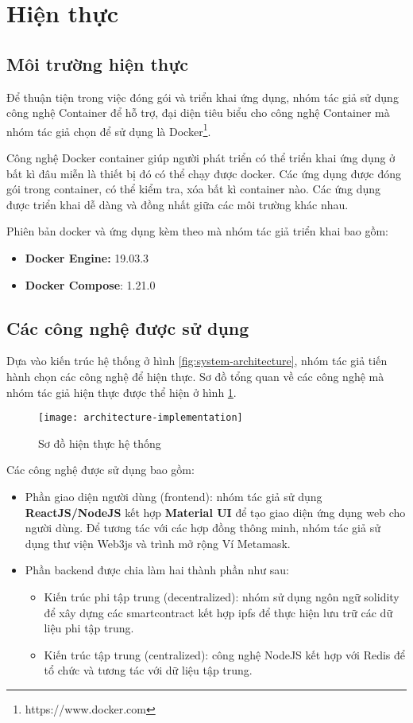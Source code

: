 \documentclass[../main-report.tex]{subfiles}
\begin{document}
\section{Hiện thực}
\subsection{Môi trường hiện thực}
Để thuận tiện trong việc đóng gói và triển khai ứng dụng, nhóm tác giả sử dụng công nghệ Container để hỗ trợ, đại diện tiêu biểu cho công nghệ Container mà nhóm tác giả chọn để sử dụng là Docker\footnote{https://www.docker.com}.

Công nghệ Docker container giúp người phát triển có thể triển khai ứng dụng ở bất kì đâu miễn là thiết bị đó có thể chạy được docker. Các ứng dụng được đóng gói trong container, có thể kiểm tra, xóa bất kì container nào. Các ứng dụng được triển khai dễ dàng và đồng nhất giữa các môi trường khác nhau.

Phiên bản docker và ứng dụng kèm theo mà nhóm tác giả triển khai bao gồm:

\begin{itemize}
\item \textbf{Docker Engine:} 19.03.3
\item \textbf{Docker Compose}: 1.21.0
\end{itemize}

\subsection{Các công nghệ được sử dụng}
Dựa vào kiến trúc hệ thống ở hình \ref{fig:system-architecture}, nhóm tác giả tiến hành chọn các công nghệ để hiện thực. Sơ đồ tổng quan về các công nghệ mà nhóm tác giả hiện thực được thể hiện ở hình \ref{fig:architecture-implementation}.

\begin{figure}[ht!]
\begin{center}
\label{fig:architecture-implementation}
\texttt{[image: architecture-implementation]}
\caption{Sơ đồ hiện thực hệ thống}
\end{center}
\end{figure}

Các công nghệ được sử dụng bao gồm:
\begin{itemize}
\item Phần giao diện người dùng (\gls{frontend}): nhóm tác giả sử dụng \textbf{ReactJS/NodeJS} kết hợp \textbf{Material UI} để tạo giao diện ứng dụng web cho người dùng. Để tương tác với các hợp đồng thông minh, nhóm tác giả sử dụng thư viện Web3js và trình mở rộng Ví Metamask.
\item Phần \gls{backend} được chia làm hai thành phần như sau:
\begin{itemize}
 \item Kiến trúc phi tập trung (decentralized): nhóm sử dụng ngôn ngữ solidity để xây dựng các \gls{smartcontract} kết hợp \acrshort{ipfs} để thực hiện lưu trữ các dữ liệu phi tập trung.
 \item Kiến trúc tập trung (centralized): công nghệ NodeJS kết hợp với Redis để tổ chức và tương tác với dữ liệu tập trung.
 \end{itemize} 
\end{itemize}
\end{document}

